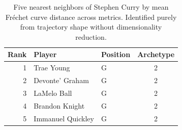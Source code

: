 \begin{table}[htbp]
  \centering\small
  \begin{tabular}{rllc}
    \toprule
    Rank & Player & Position & Archetype \\
    \midrule
    1 & Trae Young & G & 2 \\
    2 & Devonte' Graham & G & 2 \\
    3 & LaMelo Ball & G & 2 \\
    4 & Brandon Knight & G & 2 \\
    5 & Immanuel Quickley & G & 2 \\
    \bottomrule
  \end{tabular}
  \caption{Five nearest neighbors of Stephen Curry by mean Fr\'{e}chet curve distance across metrics. Identified purely from trajectory shape without dimensionality reduction.}
  \label{tab:Stephen_Curry_frechet_curve_neighbors}
\end{table}

